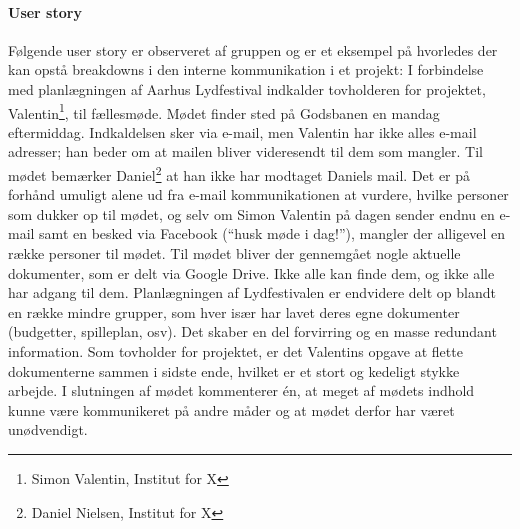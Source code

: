 \paragraph{User story}
Følgende user story er observeret af gruppen og er et eksempel på hvorledes der kan opstå breakdowns i den interne kommunikation i et projekt:
I forbindelse med planlægningen af Aarhus Lydfestival indkalder tovholderen for projektet, Valentin\footnote{Simon Valentin, Institut for X}, til fællesmøde. Mødet finder sted på Godsbanen en mandag eftermiddag. Indkaldelsen sker via e-mail, men Valentin har ikke alles e-mail adresser; han beder om at mailen bliver videresendt til dem som mangler. Til mødet bemærker Daniel\footnote{Daniel Nielsen, Institut for X} at han ikke har modtaget Daniels mail.
Det er på forhånd umuligt alene ud fra e-mail kommunikationen at vurdere, hvilke personer som dukker op til mødet, og selv om Simon Valentin på dagen sender endnu en e-mail samt en besked via Facebook (“husk møde i dag!”), mangler der alligevel en række personer til mødet.
Til mødet bliver der gennemgået nogle aktuelle dokumenter, som er delt via Google Drive. Ikke alle kan finde dem, og ikke alle har adgang til dem.
Planlægningen af Lydfestivalen er endvidere delt op blandt en række mindre grupper, som hver især har lavet deres egne dokumenter (budgetter, spilleplan, osv). Det skaber en del forvirring og en masse redundant information. Som tovholder for projektet, er det Valentins opgave at flette dokumenterne sammen i sidste ende, hvilket er et stort og kedeligt stykke arbejde.
I slutningen af mødet kommenterer én, at meget af mødets indhold kunne være kommunikeret på andre måder og at mødet derfor har været unødvendigt.
